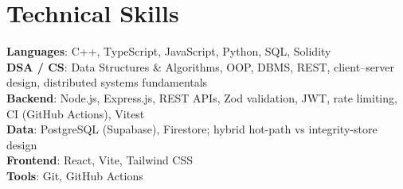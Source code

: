 \documentclass[letterpaper,11pt]{article}
\begin{document}
\section{Technical Skills}
  \begin{itemize}[leftmargin=0.15in, label={}]
    \small{\item{
      \textbf{Languages}{: C++, TypeScript, JavaScript, Python, SQL, Solidity} \\
      \textbf{DSA / CS}{: Data Structures \& Algorithms, OOP, DBMS, REST, client--server design, distributed systems fundamentals} \\
      \textbf{Backend}{: Node.js, Express.js, REST APIs, Zod validation, JWT, rate limiting, CI (GitHub Actions), Vitest} \\
      \textbf{Data}{: PostgreSQL (Supabase), Firestore; hybrid hot-path vs integrity-store design} \\
      \textbf{Frontend}{: React, Vite, Tailwind CSS} \\
      \textbf{Tools}{: Git, GitHub Actions}
    }}
  \end{itemize}
\end{document}
